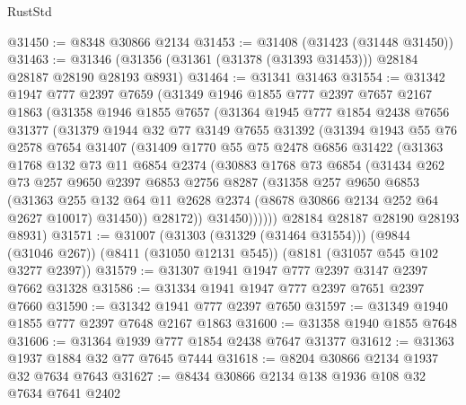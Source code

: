 \begin{lexlean}{RustStd}
\begin{coremodule}
@31450 := @8348 @30866 @2134
@31453 := @31408 (@31423 (@31448 @31450))
@31463 := @31346 (@31356 (@31361 (@31378 (@31393 @31453))) @28184 @28187 @28190 @28193 @8931)
@31464 := @31341 @31463
@31554 := @31342
    @1947
    @777
    @2397
    @7659
    (@31349
      @1946
      @1855
      @777
      @2397
      @7657
      @2167
      @1863
      (@31358
        @1946
        @1855
        @7657
        (@31364
          @1945
          @777
          @1854
          @2438
          @7656
          @31377
          (@31379
            @1944
            @32
            @77
            @3149
            @7655
            @31392
            (@31394
              @1943
              @55
              @76
              @2578
              @7654
              @31407
              (@31409
                @1770
                @55
                @75
                @2478
                @6856
                @31422
                (@31363
                  @1768
                  @132
                  @73
                  @11
                  @6854
                  @2374
                  (@30883
                    @1768
                    @73
                    @6854
                    (@31434
                      @262
                      @73
                      @257
                      @9650
                      @2397
                      @6853
                      @2756
                      @8287
                      (@31358
                        @257
                        @9650
                        @6853
                        (@31363
                          @255
                          @132
                          @64
                          @11
                          @2628
                          @2374
                          (@8678 @30866 @2134 @252 @64 @2627 @10017)
                          @31450))
                      @28172))
                  @31450))))))
      @28184
      @28187
      @28190
      @28193
      @8931)
@31571 := @31007
    (@31303 (@31329 (@31464 @31554)))
    (@9844 (@31046 @267))
    (@8411 (@31050 @12131 @545))
    (@8181 (@31057 @545 @102 @3277 @2397))
@31579 := @31307 @1941 @1947 @777 @2397 @3147 @2397 @7662 @31328
@31586 := @31334 @1941 @1947 @777 @2397 @7651 @2397 @7660
@31590 := @31342 @1941 @777 @2397 @7650
@31597 := @31349 @1940 @1855 @777 @2397 @7648 @2167 @1863
@31600 := @31358 @1940 @1855 @7648
@31606 := @31364 @1939 @777 @1854 @2438 @7647 @31377
@31612 := @31363 @1937 @1884 @32 @77 @7645 @7444
@31618 := @8204 @30866 @2134 @1937 @32 @7634 @7643
@31627 := @8434 @30866 @2134 @138 @1936 @108 @32 @7634 @7641 @2402

\end{coremodule}
\end{lexlean}
